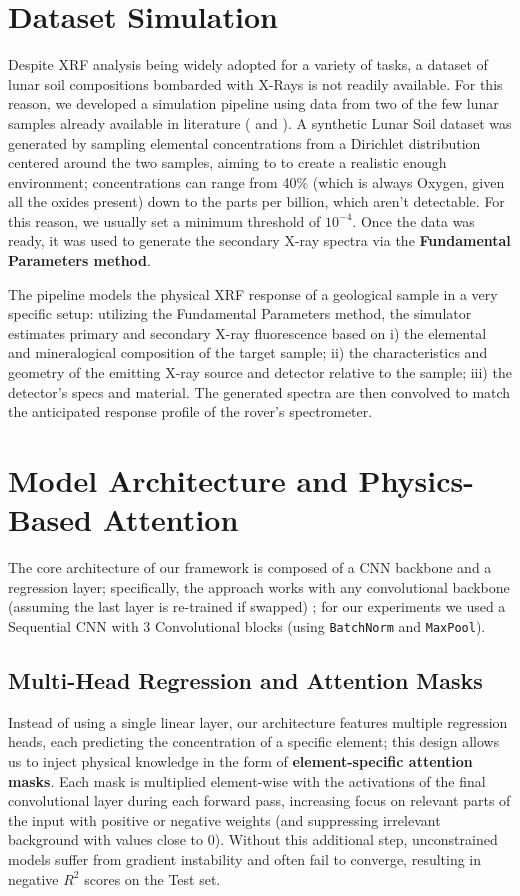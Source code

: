 \documentclass[11pt,twoside]{article}
\begin{document}
\section{Dataset Simulation}
Despite XRF analysis being widely adopted for a variety of tasks, 
a dataset of lunar soil compositions bombarded with X-Rays is not readily available. For this reason, we developed a simulation pipeline using data from two of the few lunar samples already available in literature (\citet{Meyer2011LunarSample10072} and \citet{Meyer2011LunarSample14003}). A synthetic Lunar Soil dataset was generated by sampling elemental concentrations from a Dirichlet distribution centered around the two samples, aiming to to create a realistic enough environment; concentrations can range from 40\% (which is always Oxygen, given all the oxides present) down to the parts per billion, which aren't detectable. For this reason, we usually set a minimum threshold of $10^{-4}$.
Once the data was ready, it was used to generate the secondary X-ray spectra via the \textbf{Fundamental Parameters method}.

The pipeline models the physical XRF response of a geological sample in a very specific setup: utilizing the Fundamental Parameters method, the simulator estimates primary and secondary X-ray fluorescence based on i) the elemental and mineralogical composition of the target sample; ii) the characteristics and geometry of the emitting X-ray source and detector relative to the sample; iii) the detector's specs and material.
The generated spectra are then convolved to match the anticipated response profile of the rover's spectrometer.

\section{Model Architecture and Physics-Based Attention}
The core architecture of our framework is composed of a CNN backbone and a regression layer; specifically, the approach works with any convolutional backbone (assuming the last layer is re-trained if swapped)
; for our experiments we used a Sequential CNN with 3 Convolutional blocks (using \texttt{BatchNorm} and \texttt{MaxPool}).

\subsection{Multi-Head Regression and Attention Masks}
Instead of using a single linear layer, our architecture features multiple regression heads, each predicting the concentration of a specific element; this design allows us to inject physical knowledge in the form of \textbf{element-specific attention masks}. Each mask is multiplied element-wise with the activations of the final convolutional layer during each forward pass, increasing focus on relevant parts of the input with positive or negative weights (and suppressing irrelevant background with values close to 0). Without this additional step, unconstrained models suffer from gradient instability and often fail to converge, resulting in negative $R^2$ scores on the Test set.
\end{document}
